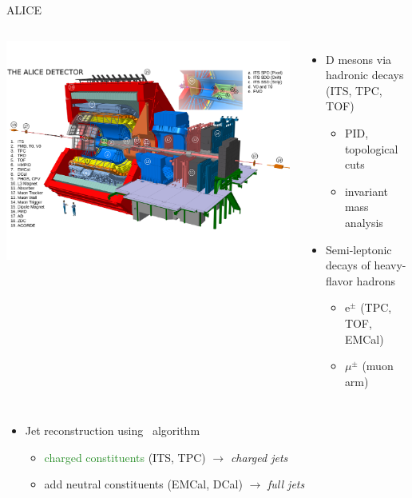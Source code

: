 \documentclass[xcolor={usenames,dvipsnames}]{beamer}
\begin{document}
\begin{frame}{ALICE}
\begin{columns}

\includegraphics[width=\textwidth]{img/ALICE_Schematics}

\small
\begin{itemize}
\item \alert{D mesons} via hadronic decays (ITS, TPC, TOF)
\begin{itemize}
\item \footnotesize PID, topological cuts
\item \footnotesize invariant mass analysis
\end{itemize}
\item Semi-leptonic decays of heavy-flavor hadrons
\begin{itemize}
\item \footnotesize \alert{e$^{\pm}$} (TPC, TOF, EMCal)
\item \footnotesize \alert{$\mu^{\pm}$} (muon arm)
\end{itemize}
\end{itemize}
\end{columns}
\begin{itemize}
\item \alert{Jet reconstruction} using \antikt\ algorithm
\begin{itemize}
\item \textcolor{ForestGreen}{charged constituents} (ITS, TPC) $\rightarrow$ \emph{charged jets}
\item add \textcolor{NavyBlue}{neutral constituents} (EMCal, DCal) $\rightarrow$ \emph{full jets} 
\end{itemize}
\end{itemize}
\end{frame}
\end{document}
